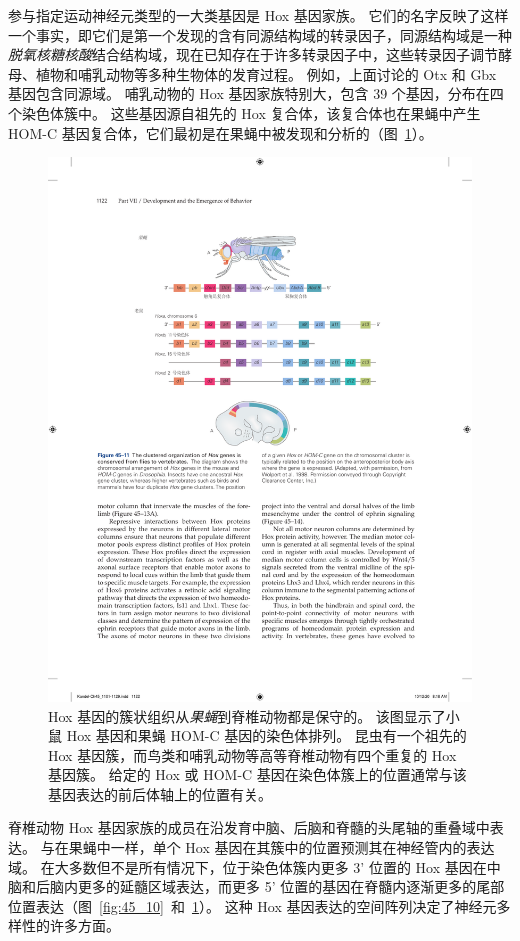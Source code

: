 参与指定运动神经元类型的一大类基因是 Hox 基因家族。
它们的名字反映了这样一个事实，即它们是第一个发现的含有同源结构域的转录因子，同源结构域是一种\textit{脱氧核糖核酸}结合结构域，现在已知存在于许多转录因子中，这些转录因子调节酵母、植物和哺乳动物等多种生物体的发育过程。
例如，上面讨论的 Otx 和 Gbx 基因包含同源域。
哺乳动物的 Hox 基因家族特别大，包含 39 个基因，分布在四个染色体簇中。
这些基因源自祖先的 Hox 复合体，该复合体也在果蝇中产生 HOM-C 基因复合体，它们最初是在果蝇中被发现和分析的（图~\ref{fig:45_11}）。


\begin{figure}[htbp]
	\centering
	\includegraphics[width=0.95\linewidth]{chap45/fig_45_11}
	\caption{Hox 基因的簇状组织从\textit{果蝇}到脊椎动物都是保守的。
		该图显示了小鼠 Hox 基因和果蝇 HOM-C 基因的染色体排列。
		昆虫有一个祖先的 Hox 基因簇，而鸟类和哺乳动物等高等脊椎动物有四个重复的 Hox 基因簇。
		给定的 Hox 或 HOM-C 基因在染色体簇上的位置通常与该基因表达的前后体轴上的位置有关\cite{wolpert2015principles}。 }
	\label{fig:45_11}
\end{figure}


脊椎动物 Hox 基因家族的成员在沿发育中脑、后脑和脊髓的头尾轴的重叠域中表达。
与在果蝇中一样，单个 Hox 基因在其簇中的位置预测其在神经管内的表达域。
在大多数但不是所有情况下，位于染色体簇内更多 3' 位置的 Hox 基因在中脑和后脑内更多的延髓区域表达，而更多 5' 位置的基因在脊髓内逐渐更多的尾部位置表达（图~\ref{fig:45_10}~和~\ref{fig:45_11}）。
这种 Hox 基因表达的空间阵列决定了神经元多样性的许多方面。


